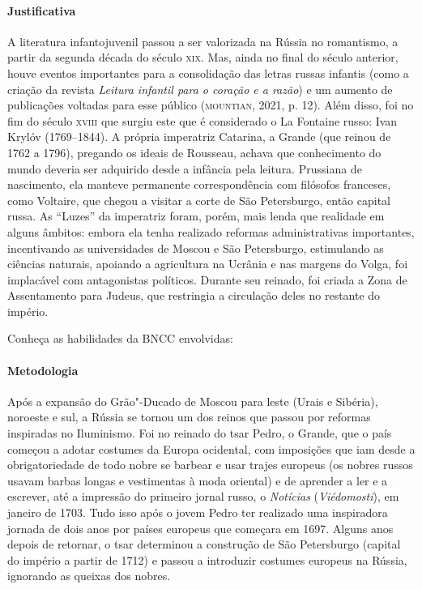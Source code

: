 \documentclass[11pt]{extarticle}
\begin{document}
\paragraph{Justificativa}
A literatura infantojuvenil passou a ser valorizada na Rússia no
romantismo, a partir da segunda década do século \textsc{xix}. Mas, ainda no
final do século anterior, houve eventos importantes para a consolidação
das letras russas infantis (como a criação da revista \emph{Leitura
infantil para o coração e a razão}) e um aumento de publicações voltadas
para esse público (\textsc{mountian}, 2021, p. 12). Além disso, foi no fim do
século \textsc{xviii} que surgiu este que é considerado o La Fontaine russo: Ivan
Krylóv (1769--1844). A própria imperatriz Catarina, a Grande (que reinou
de 1762 a 1796), pregando os ideais de Rousseau, achava que conhecimento
do mundo deveria ser adquirido desde a infância pela leitura. Prussiana
de nascimento, ela manteve permanente correspondência com filósofos
franceses, como Voltaire, que chegou a visitar a corte de São
Petersburgo, então capital russa. As ``Luzes'' da imperatriz foram, porém,
mais lenda que realidade em alguns âmbitos: embora ela tenha realizado
reformas administrativas importantes, incentivando as universidades de
Moscou e São Petersburgo, estimulando as ciências naturais, apoiando a
agricultura na Ucrânia e nas margens do Volga, foi implacável com
antagonistas políticos. Durante seu reinado, foi criada a Zona de
Assentamento para Judeus, que restringia a circulação deles no restante
do império.


Conheça as habilidades da BNCC envolvidas:

\paragraph{Metodologia}
Após a expansão do Grão"-Ducado de Moscou para leste (Urais e Sibéria),
noroeste e sul, a Rússia se tornou um dos reinos que passou por reformas
inspiradas no Iluminismo. Foi no reinado do tsar Pedro, o Grande, que o
país começou a adotar costumes da Europa ocidental, com imposições que
iam desde a obrigatoriedade de todo nobre se barbear e usar trajes
europeus (os nobres russos usavam barbas longas e vestimentas à moda
oriental) e de aprender a ler e a escrever, até a impressão do primeiro
jornal russo, o \emph{Notícias} (\emph{Viédomosti}), em janeiro de 1703.
Tudo isso após o jovem Pedro ter realizado uma inspiradora jornada de
dois anos por países europeus que começara em 1697. Alguns anos depois
de retornar, o tsar determinou a construção de São Petersburgo (capital
do império a partir de 1712) e passou a introduzir costumes europeus na
Rússia, ignorando as queixas dos nobres.
\end{document}
